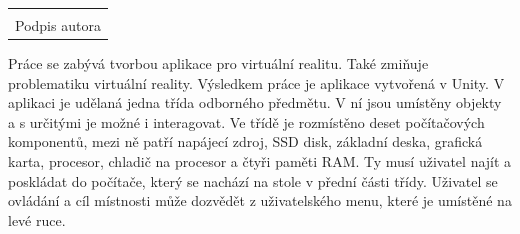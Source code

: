 \documentclass[12pt, a4paper,
twoside,        %
openright
]{report}
\newcommand\datumOdevzdani{1. 1. 2024} %
\begin{document}


	
	\vspace*{0.7\textheight} %

	\vfill
	\noindent{V Opavě \datumOdevzdani\\}
	\noindent
	\begin{minipage}{\linewidth}
		\hspace{9.5cm} 
		\begin{tabular}{@{}p{6cm}@{}}
			\dotfill \\
			Podpis autora
		\end{tabular}
	\end{minipage}


Práce se zabývá tvorbou aplikace pro virtuální realitu. Také zmiňuje problematiku virtuální reality. Výsledkem práce je aplikace vytvořená v Unity. V aplikaci je udělaná jedna třída odborného předmětu. V ní jsou umístěny objekty a s určitými je možné i interagovat. Ve třídě je rozmístěno deset počítačových komponentů, mezi ně patří napájecí zdroj, SSD disk, základní deska, grafická karta, procesor, chladič na procesor a čtyři paměti RAM. Ty musí uživatel najít a poskládat do počítače, který se nachází na stole v přední části třídy. Uživatel se ovládání a cíl místnosti může dozvědět z uživatelského menu, které je umístěné na levé ruce.
\end{document}
